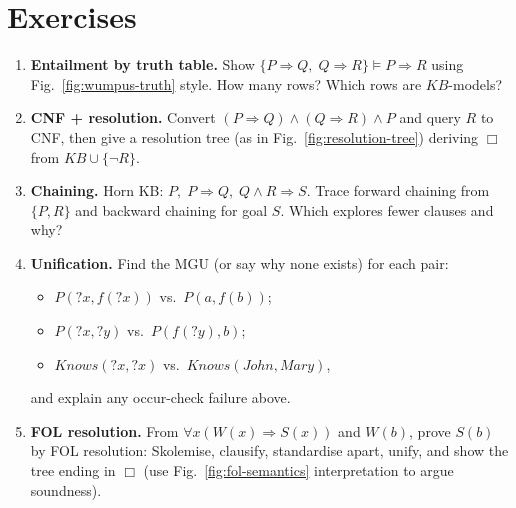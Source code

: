 \section{Exercises}\label{sec:ch06-ex}
\begin{enumerate}[label=E6.\arabic*, leftmargin=*, itemsep=0.7em]
    \item \textbf{Entailment by truth table.} Show $\{P\Rightarrow Q,\;Q\Rightarrow R\}\models P\Rightarrow R$ using Fig.~\ref{fig:wumpus-truth} style. How many rows? Which rows are $KB$-models?
    \item \textbf{CNF + resolution.} Convert $(P\Rightarrow Q)\land(Q\Rightarrow R)\land P$ and query $R$ to CNF, then give a resolution tree (as in Fig.~\ref{fig:resolution-tree}) deriving $\Box$ from $KB\cup\{\lnot R\}$.
    \item \textbf{Chaining.} Horn KB: $P,\;P\Rightarrow Q,\;Q\land R\Rightarrow S$. Trace forward chaining from $\{P,R\}$ and backward chaining for goal $S$. Which explores fewer clauses and why?
    \item \textbf{Unification.} Find the MGU (or say why none exists) for each pair:
    \begin{itemize}[itemsep=0.15em]
        \item $P(?x, f(?x))$ vs.\ $P(a, f(b))$;
        \item $P(?x, ?y)$ vs.\ $P(f(?y), b)$;
        \item $Knows(?x,?x)$ vs.\ $Knows(John, Mary)$,
    \end{itemize}
    and explain any occur-check failure above.
    \item \textbf{FOL resolution.} From $\forall x(W(x)\Rightarrow S(x))$ and $W(b)$, prove $S(b)$ by FOL resolution: Skolemise, clausify, standardise apart, unify, and show the tree ending in $\Box$ (use Fig.~\ref{fig:fol-semantics} interpretation to argue soundness).
\end{enumerate}
